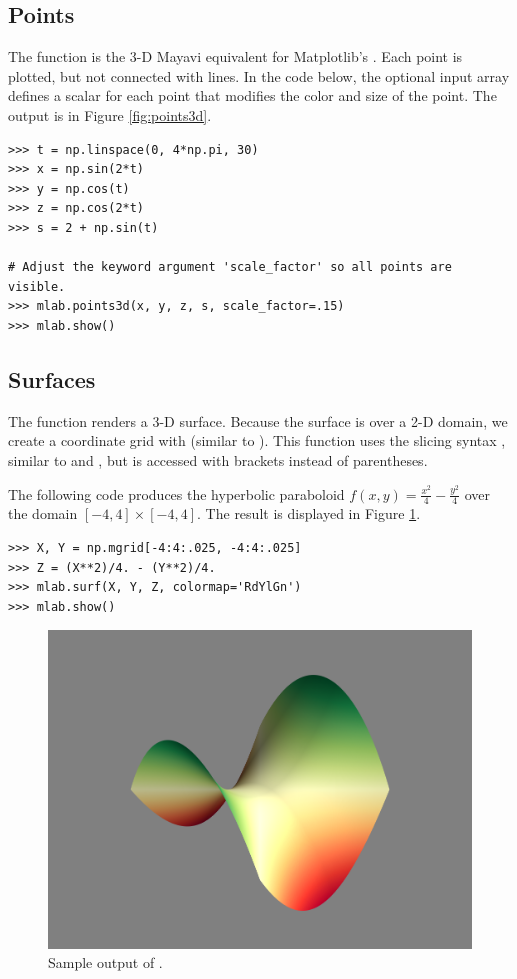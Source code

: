 \subsection*{Points} %

The function  is the 3-D Mayavi equivalent for Matplotlib's .
Each point is plotted, but not connected with lines.
In the code below, the optional input array  defines a scalar for each point that modifies the color and size of the point.
The output is in Figure \ref{fig:points3d}.

\begin{lstlisting}
>>> t = np.linspace(0, 4*np.pi, 30)
>>> x = np.sin(2*t)
>>> y = np.cos(t)
>>> z = np.cos(2*t)
>>> s = 2 + np.sin(t)

# Adjust the keyword argument 'scale_factor' so all points are visible.
>>> mlab.points3d(x, y, z, s, scale_factor=.15)
>>> mlab.show()
\end{lstlisting}

\subsection*{Surfaces} %

The function  renders a 3-D surface.
Because the surface is over a 2-D domain, we create a coordinate grid with  (similar to ).
This function uses the slicing syntax , similar to  and , but is accessed with brackets instead of parentheses.

The following code produces the hyperbolic paraboloid $f(x,y) = \frac{x^2}{4} - \frac{y^2}{4}$ over the domain $[-4,4]\times[-4,4]$.
The result is displayed in Figure \ref{fig:surf_example}.

\begin{lstlisting}
>>> X, Y = np.mgrid[-4:4:.025, -4:4:.025]
>>> Z = (X**2)/4. - (Y**2)/4.
>>> mlab.surf(X, Y, Z, colormap='RdYlGn')
>>> mlab.show()
\end{lstlisting}

\begin{figure}
\includegraphics[width=.7\textwidth]{mesh_example.png}
\caption{Sample output of .}
\label{fig:surf_example}
\end{figure}

